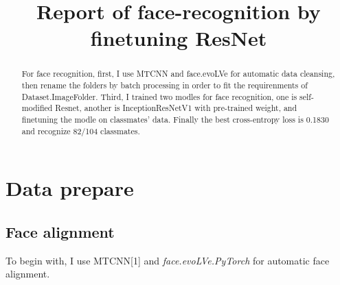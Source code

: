 \documentclass{article}
\title{Report of face-recognition by finetuning ResNet}
\author{
   Haorui Li\thanks \\
  Chien-Shiung Wu College\\
  Southeast University\\
}
\begin{document}
\maketitle

\begin{abstract}
For face recognition, first, I use MTCNN and face.evoLVe for automatic data cleansing, then rename the folders by batch processing in order to fit the requirenments of Dataset.ImageFolder. Third, I trained two modles for face recognition, one is self-modified Resnet, another is InceptionResNetV1 with pre-trained weight, and finetuning the modle on classmates' data. Finally the best cross-entropy loss is 0.1830 and recognize 82/104 classmates.  
\end{abstract}

\section{Data prepare}
\subsection{Face alignment}
To begin with, I use MTCNN[1] and \textit{face.evoLVe.PyTorch} for automatic face alignment.
\end{document}
